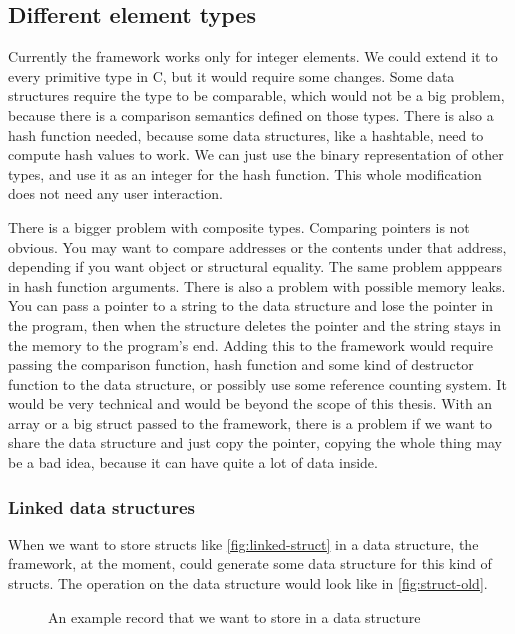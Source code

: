 \documentclass[a4paper,11pt]{article}
\begin{document}
	\subsection{Different element types}

		Currently the framework works only for integer elements. We could extend it to every primitive type in
		C, but it would require some changes.  Some data structures require the type to be comparable, which
		would not be a big problem, because there is a comparison semantics defined on those types. There is also
		a hash function needed, because some data structures, like a hashtable, need to compute hash values to
		work. We can just use the binary representation of other types, and use it as an integer for the hash
		function. This whole modification does not need any user interaction.

		There is a bigger problem with composite types. Comparing pointers is not obvious. You may want to compare
		addresses or the contents under that address, depending if you want object or structural equality. The
		same problem apppears in hash function arguments. There is also a problem with possible memory leaks. You can
		pass a pointer to a string to the data structure and lose the pointer in the program, then when the
		structure deletes the pointer and the string stays in the memory to the program's end. Adding this to
		the framework would require passing the comparison function, hash function and some kind of destructor
		function to the data structure, or possibly use some reference counting system. It would be very
		technical and would be beyond the scope of this thesis. With an array or a big struct passed to the
		framework, there is a problem if we want to share the data structure and just copy the pointer, copying
		the whole thing may be a bad idea, because it can have quite a lot of data inside.

		\subsubsection{Linked data structures}

			When we want to store structs like \autoref{fig:linked-struct} in a data structure, the
			framework, at the moment, could generate some data structure for this kind of structs. The
			operation on the data structure would look like in \autoref{fig:struct-old}.

            \begin{figure}[h!]
				

				\caption{An example record that we want to store in a data structure}

				\label{fig:linked-struct}
			\end{figure}
\end{document}
